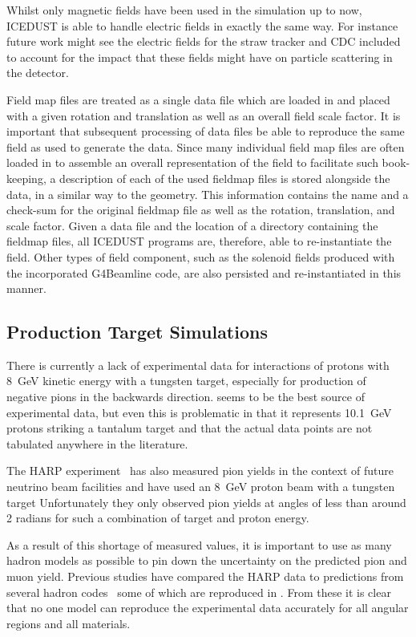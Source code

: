 Whilst only magnetic fields have been used in the simulation up to now, ICEDUST is able to handle electric fields in exactly the same way.
For instance future work might see the electric fields for the straw tracker and CDC included to account for the impact that these fields might have on particle scattering in the detector.

Field map files are treated as a single data file which are loaded in and placed with a given rotation and translation as well as an overall field scale factor.
It is important that subsequent processing of data files be able to reproduce the same field as used to generate the data.
Since many individual field map files are often loaded in to assemble an overall representation of the field to facilitate such book-keeping, a description of each of the used fieldmap files is stored alongside the data, in a similar way to the geometry.
This information contains the name and a check-sum for the original fieldmap file as well as the rotation, translation, and scale factor.
Given a data file and the location of a directory containing the fieldmap files, all ICEDUST programs are, therefore, able to re-instantiate the field.
Other types of field component, such as the solenoid fields produced with the incorporated G4Beamline code, are also persisted and re-instantiated in this manner.

\subsection{Production Target Simulations}
\FigPiYieldHadronCodes
There is currently a lack of experimental data for interactions of protons with 8~GeV kinetic energy with a tungsten target, especially for production of negative pions in the backwards direction.
 seems to be the best source of experimental data, but even this is problematic in that it represents 10.1~GeV protons striking a tantalum target and that the actual data points are not tabulated anywhere in the literature.

The HARP experiment~\cite{HARP2007} has also measured pion yields in the context of future neutrino beam facilities and have used an 8~GeV proton beam with a tungsten target
Unfortunately they only observed pion yields at angles of less than around 2 radians for such a combination of target and proton energy.

As a result of this shortage of measured values, it is important to use as many hadron models as possible to pin down the uncertainty on the predicted pion and muon yield.
Previous studies have compared the HARP data to predictions from several hadron codes~\cite{AEdmondsThesis,YeYangPrivate} some of which are reproduced in .
From these it is clear that no one model can reproduce the experimental data accurately for all angular regions and all materials.

